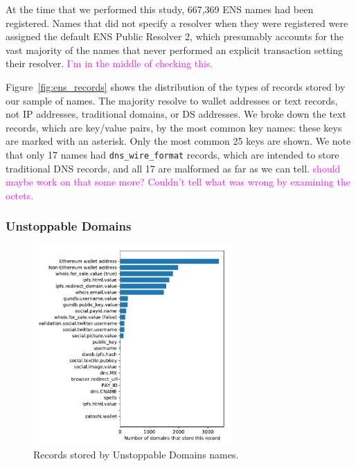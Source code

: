 \documentclass[conference]{IEEEtran}
\newcommand{\randall}{\ding{110}\ding{43}\textcolor{magenta}}
\newcommand{\randall}{}
\begin{document}
At the time that we performed this study, 667,369 ENS names had been 
registered. Names that did not specify a resolver when they were registered 
were assigned the default ENS Public Resolver 2, which presumably accounts for 
the vast majority of the names that never performed an explicit transaction 
setting their resolver. \randall{I'm in the middle of checking this.} 

Figure~\ref{fig:ens_records} shows the distribution of the types of records 
stored by our sample of names. The majority resolve to wallet addresses or text 
records, not IP addresses, traditional domains, or DS addresses. We broke down 
the text records, which are key/value pairs, by the most common key names: 
these keys are marked with an asterisk. Only the most common 25 keys are shown. 
We note that only 17 names had \texttt{dns\_wire\_format} records, which are 
intended to store traditional DNS 
records, and all 17 are malformed as far as we can tell. \randall{should maybe 
work on that some more? Couldn't tell what was wrong by examining the octets.}

%

\subsubsection{Unstoppable Domains}

\begin{figure}[t]
	\centering
	\includegraphics[width=3in]{figs/all_unstoppable_records.pdf}
	\caption{Records stored by Unstoppable Domains names.}
	\label{fig:unstoppable_records}
\end{figure}
\end{document}
